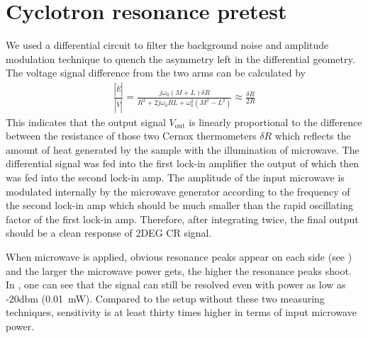 \documentclass[12pt]{ruthesis}
\begin{document}
\section{Cyclotron resonance pretest}\label{Cyclotron}


 
We used a differential circuit to filter the background noise and amplitude modulation technique to quench the asymmetry left in the differential geometry.
The voltage signal difference from the two arms can be calculated by
\begin{align} 
\frac{|\tilde{E}|}{|\tilde{V}|}=\frac{j \omega_{0}(M+L)\delta R}{R^{2}+2j \omega_{0}RL + \omega_{0}^{2} (M^{2}-L^{2})} \approx \frac{\delta R}{2R}
\end{align} 
This indicates that the output signal $V_{\mathrm{out}}$ is linearly proportional to the difference between the resistance of those two Cernox thermometers $\delta R$ which reflects the amount of heat generated by the sample with the illumination of microwave.
The differential signal was fed into the first lock-in amplifier the output of which then was fed into the second lock-in amp. 
The amplitude of the input microwave is modulated internally by the microwave generator according to the frequency of the second lock-in amp which should be much smaller than the rapid oscillating factor of the first lock-in amp. 
Therefore, after integrating twice, the final output should be a clean response of 2DEG CR signal.     


When microwave is applied, obvious resonance peaks appear on each side (see ) and the larger the microwave power gets, the higher the resonance peaks shoot. In , one can see that the signal can still be resolved even with power as low as -20dbm (\SI{0.01}{\milli \watt}). 
Compared to the setup without these two measuring techniques, sensitivity is at least thirty times higher in terms of input microwave power.  
\end{document}
